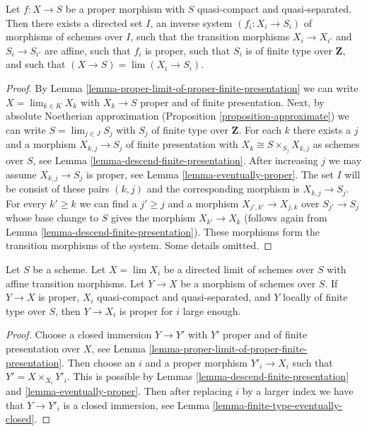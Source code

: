 \begin{lemma}
\label{lemma-proper-limit-of-proper-finite-presentation-noetherian}
Let $f : X \to S$ be a proper morphism with $S$ quasi-compact and
quasi-separated. Then there exists a directed set $I$, an
inverse system $(f_i : X_i \to S_i)$ of morphisms of schemes over $I$,
such that the transition morphisms $X_i \to X_{i'}$ and $S_i \to S_{i'}$
are affine, such that $f_i$ is proper, such that $S_i$ is of finite
type over $\mathbf{Z}$, and such that
$(X \to S) = \lim (X_i \to S_i)$.
\end{lemma}

\begin{proof}
By Lemma \ref{lemma-proper-limit-of-proper-finite-presentation}
we can write $X = \lim_{k \in K} X_k$ with $X_k \to S$ proper and
of finite presentation. Next, by absolute Noetherian approximation
(Proposition \ref{proposition-approximate}) we can
write $S = \lim_{j \in J} S_j$ with $S_j$ of finite type over $\mathbf{Z}$.
For each $k$ there exists a $j$ and a morphism $X_{k, j} \to S_j$
of finite presentation with $X_k \cong S \times_{S_j} X_{k, j}$
as schemes over $S$, see
Lemma \ref{lemma-descend-finite-presentation}.
After increasing $j$ we may assume $X_{k, j} \to S_j$ is proper, see
Lemma \ref{lemma-eventually-proper}. The set $I$ will be consist
of these pairs $(k, j)$ and the corresponding morphism is $X_{k, j} \to S_j$.
For every $k' \geq k$ we can find a $j' \geq j$ and a morphism
$X_{j', k'} \to X_{j, k}$ over $S_{j'} \to S_j$ whose base change to $S$
gives the morphism $X_{k'} \to X_k$ (follows again from
Lemma \ref{lemma-descend-finite-presentation}).
These morphisms form the transition morphisms of the system. Some details
omitted.
\end{proof}

\begin{lemma}
\label{lemma-finite-type-eventually-proper}
Let $S$ be a scheme. Let $X = \lim X_i$ be a directed limit of
schemes over $S$ with affine transition morphisms. Let $Y \to X$
be a morphism of schemes over $S$.
If $Y \to X$ is proper, $X_i$ quasi-compact and quasi-separated, and
$Y$ locally of finite type over $S$, then $Y \to X_i$ is proper
for $i$ large enough.
\end{lemma}

\begin{proof}
Choose a closed immersion $Y \to Y'$ with $Y'$ proper and of finite
presentation over $X$, see
Lemma \ref{lemma-proper-limit-of-proper-finite-presentation}.
Then choose an $i$ and a proper morphism $Y'_i \to X_i$
such that $Y' = X \times_{X_i} Y'_i$. This is possible by
Lemmas \ref{lemma-descend-finite-presentation} and
\ref{lemma-eventually-proper}. Then after replacing $i$
by a larger index we have that $Y \to Y'_i$ is a closed
immersion, see Lemma \ref{lemma-finite-type-eventually-closed}.
\end{proof}


